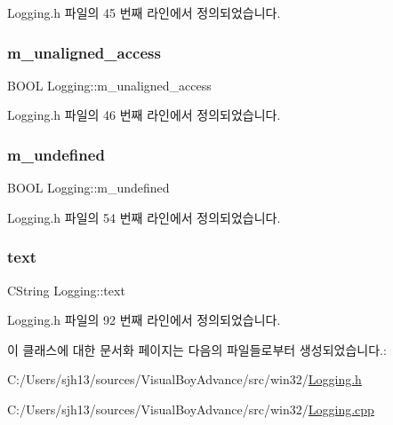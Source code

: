 Logging.\+h 파일의 45 번째 라인에서 정의되었습니다.

\mbox{\label{class_logging_a7d30e53c3d12b78d9db8627a39fa9d4e}} 
\subsubsection{\texorpdfstring{m\+\_\+unaligned\+\_\+access}{m\_unaligned\_access}}
{\footnotesize\ttfamily B\+O\+OL Logging\+::m\+\_\+unaligned\+\_\+access}



Logging.\+h 파일의 46 번째 라인에서 정의되었습니다.

\mbox{\label{class_logging_a622f9b082c10c8195c5faa7a8577d520}} 
\subsubsection{\texorpdfstring{m\+\_\+undefined}{m\_undefined}}
{\footnotesize\ttfamily B\+O\+OL Logging\+::m\+\_\+undefined}



Logging.\+h 파일의 54 번째 라인에서 정의되었습니다.

\mbox{\label{class_logging_a4a9482d0ffecc6b04232867690fd7b21}} 
\subsubsection{\texorpdfstring{text}{text}}
{\footnotesize\ttfamily C\+String Logging\+::text\hspace{0.3cm}{\ttfamily [static]}}



Logging.\+h 파일의 92 번째 라인에서 정의되었습니다.



이 클래스에 대한 문서화 페이지는 다음의 파일들로부터 생성되었습니다.\+:\begin{DoxyCompactItemize}
\item 
C\+:/\+Users/sjh13/sources/\+Visual\+Boy\+Advance/src/win32/\mbox{\hyperlink{_logging_8h}{Logging.\+h}}\item 
C\+:/\+Users/sjh13/sources/\+Visual\+Boy\+Advance/src/win32/\mbox{\hyperlink{_logging_8cpp}{Logging.\+cpp}}\end{DoxyCompactItemize}
